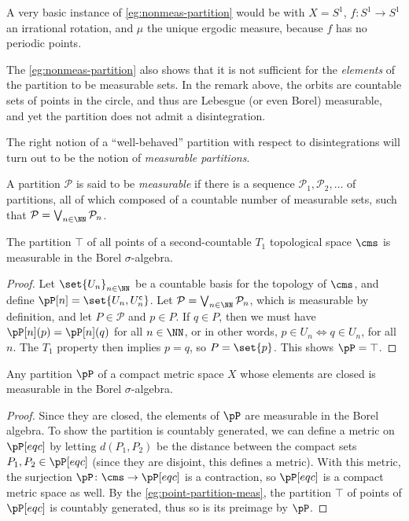 \documentclass[../main]{subfiles}
\begin{document}
\begin{remark}
  A very basic instance of \cref{eg:nonmeas-partition} would be with \(X = S^1\), \(f \colon S^1 \to S^1\) an irrational rotation, and \(\mu\) the unique ergodic measure, because \(f\) has no periodic points.
\end{remark}

\begin{remark}
  The \cref{eg:nonmeas-partition} also shows that it is not sufficient for the \emph{elements} of the partition to be measurable sets. In the remark above, the orbits are countable sets of points in the circle, and thus are Lebesgue (or even Borel) measurable, and yet the partition does not admit a disintegration.
\end{remark}

The right notion of a ``well-behaved'' partition with respect to disintegrations will turn out to be the notion of \emph{measurable partitions}.

\begin{definition}
  A partition \(\mathcal{P}\) is said to be \emph{measurable} if there is a sequence \(\mathcal{P}_1, \mathcal{P}_2,\dots\) of partitions, all of which composed of a countable number of measurable sets, such that \(\mathcal{P} = \bigvee_{n \in \NN} \mathcal{P}_n\).
\end{definition}

\begin{example}\label{eg:point-partition-meas}
  The partition \(\top\) of all points of a second-countable \(T_1\) topological space \(\cms\) is measurable in the Borel \(\sigma\)-algebra.
\end{example}
\begin{proof}
  Let \(\set{U_n}_{n \in \NN}\) be a countable basis for the topology of \(\cms\), and define \(\pP[n] = \set{U_n, U_n^{\complement}}\). Let \(\mathcal{P} = \bigvee_{n \in \NN} \mathcal{P}_n\), which is measurable by definition, and let \(P \in \mathcal{P}\) and \(p \in P\). If \(q \in P\), then we must have \(\pP[n](p) = \pP[n](q)\) for all \(n \in \NN\), or in other words, \(p \in U_n \iff q \in U_n\), for all \(n\). The \(T_1\) property then implies \(p = q\), so \(P = \set{p}\). This shows \(\pP = \top\).
\end{proof}

\begin{example}
  Any partition \(\pP\) of a compact metric space \(X\) whose elements are closed is measurable in the Borel \(\sigma\)-algebra.
\end{example}
\begin{proof}
  Since they are closed, the elements of \(\pP\) are measurable in the Borel algebra. To show the partition is countably generated, we can define a metric on \(\pP[eqc]\) by letting \(d(P_1,P_2)\) be the distance between the compact sets \(P_1, P_2 \in \pP[eqc]\) (since they are disjoint, this defines a metric). With this metric, the surjection \(\pP \colon \cms \to \pP[eqc]\) is a contraction, so \(\pP[eqc]\) is a compact metric space as well. By the \cref{eg:point-partition-meas}, the partition \(\top\) of points of \(\pP[eqc]\) is countably generated, thus so is its preimage by \(\pP\).
\end{proof}
\end{document}
